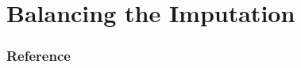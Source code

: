 \documentclass{beamer}
\begin{document}



\section{Balancing the Imputation}

\frame{
  \frametitle{}

}

\frame{
  \frametitle{}
}


\frame{
  \frametitle{}
}

\frame{
  \frametitle{}
}

\frame{
  \frametitle{}
}






\begin{frame}[allowframebreaks]
  \frametitle{Reference}
  \begin{thebibliography}{10}
  \end{thebibliography}
\end{frame}
  
\end{document}
